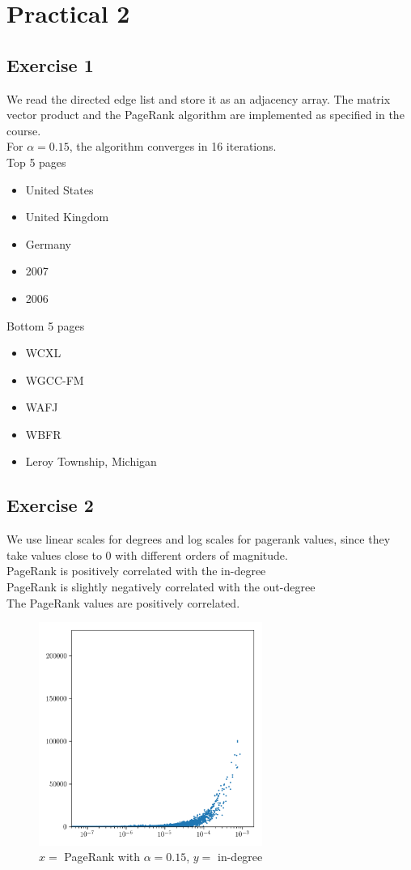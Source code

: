 \documentclass{article}
\begin{document}
\section*{Practical 2}%
\label{sec:tp2}
\subsection*{Exercise 1}%
\label{sub:tp2ex1}
We read the directed edge list and store it as an adjacency array.
The matrix vector product and the PageRank algorithm are implemented as
specified in the course.\\
For $\alpha = 0.15$, the algorithm converges in 16 iterations.\\
Top 5 pages
\begin{itemize}
    \item United States
    \item United Kingdom
    \item Germany
    \item 2007
    \item 2006
\end{itemize}
Bottom 5 pages
\begin{itemize}
    \item WCXL
    \item WGCC-FM
    \item WAFJ
    \item WBFR
    \item Leroy Township, Michigan
\end{itemize}

\subsection*{Exercise 2}%
\label{sub:tp2ex2}
We use linear scales for degrees and log scales for pagerank values, since they
take values close to 0 with different orders of magnitude.\\
PageRank is positively correlated with the in-degree\\
PageRank is slightly negatively correlated with the out-degree\\
The PageRank values are positively correlated.

\begin{figure}[H]
    \centering
    \includegraphics[width=0.65\textwidth]{plots/1.png}
    \caption{$x =$ PageRank with $\alpha = 0.15$, $y = $ in-degree}
    \label{fig:1}
\end{figure}
\end{document}
